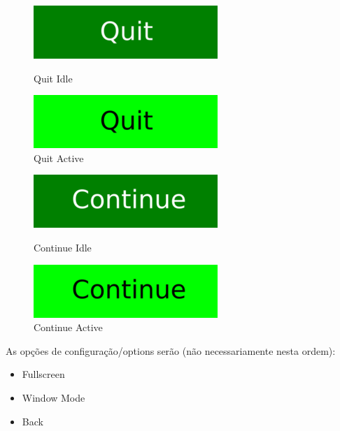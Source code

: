 \documentclass[12pt]{article}
\begin{document}
\begin{figure}[!htb]
	\centering
	\begin{minipage}{0.5\textwidth}
		\centering
		\includegraphics[scale=1]{menu_buttom/quit_idle.png}
		\caption{Quit Idle}
		\label{quit_idle}
	\end{minipage}%
	\begin{minipage}{0.5\textwidth}
		\centering
		\includegraphics[scale=1]{menu_buttom/quit_active.png}
		\caption{Quit Active}
		\label{quit_active}
	\end{minipage}
\end{figure}

\begin{figure}[!htb]
	\centering
	\begin{minipage}{0.5\textwidth}
		\centering
		\includegraphics[scale=1]{menu_buttom/continue_idle.png}
		\caption{Continue Idle}
		\label{continue_idle}
	\end{minipage}%
	\begin{minipage}{0.5\textwidth}
		\centering
		\includegraphics[scale=1]{menu_buttom/continue_active.png}
		\caption{Continue Active}
		\label{continue_active}
	\end{minipage}
\end{figure}

\newpage
As opções de configuração/options serão (não necessariamente nesta ordem):

\begin{itemize}
    \item Fullscreen
    \item Window Mode
    \item Back
\end{itemize}
\end{document}
